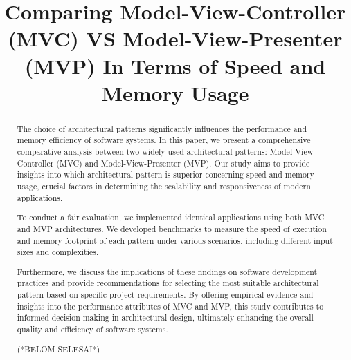 \documentclass[conference]{IEEEtran}
\begin{document}
\title{Comparing Model-View-Controller (MVC) VS Model-View-Presenter (MVP) In Terms of Speed and Memory Usage \\
}
\author{
\and
{}
\and
{}
\and
{}

}

\maketitle

\begin{abstract}
The choice of architectural patterns significantly influences the performance and memory efficiency of software systems. In this paper, we present a comprehensive comparative analysis between two widely used architectural patterns: Model-View-Controller (MVC) and Model-View-Presenter (MVP). Our study aims to provide insights into which architectural pattern is superior concerning speed and memory usage, crucial factors in determining the scalability and responsiveness of modern applications.

To conduct a fair evaluation, we implemented identical applications using both MVC and MVP architectures. We developed benchmarks to measure the speed of execution and memory footprint of each pattern under various scenarios, including different input sizes and complexities. 

Furthermore, we discuss the implications of these findings on software development practices and provide recommendations for selecting the most suitable architectural pattern based on specific project requirements. By offering empirical evidence and insights into the performance attributes of MVC and MVP, this study contributes to informed decision-making in architectural design, ultimately enhancing the overall quality and efficiency of software systems. 

(*BELOM SELESAI*)
\end{abstract}
\end{document}

